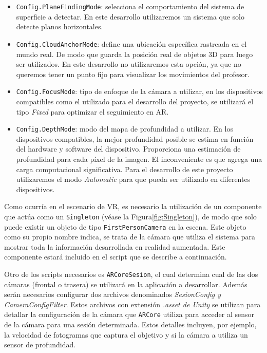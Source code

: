\begin{itemize}
    \item \texttt{Config.PlaneFindingMode}: selecciona el comportamiento del sistema de superficie a detectar. En este desarrollo utilizaremos un sistema que solo detecte planos horizontales.
    \item \texttt{Config.CloudAnchorMode}: define una ubicación específica rastreada en el mundo real. De modo que guarda la posición real de objetos 3D para luego ser utilizados. En este desarrollo no utilizaremos esta opción, ya que no queremos tener un punto fijo para visualizar los movimientos del profesor.
    \item \texttt{Config.FocusMode}: tipo de enfoque de la cámara a utilizar, en los dispositivos compatibles como el utilizado para el desarrollo del proyecto, se utilizará el tipo \textit{Fixed} para optimizar el seguimiento en AR.
    \item \texttt{Config.DepthMode}: modo del mapa de profundidad a utilizar. En los dispositivos compatibles, la mejor profundidad posible se estima en función del hardware y software del dispositivo. Proporciona una estimación de profundidad para cada píxel de la imagen. El inconveniente es que agrega una carga computacional significativa. Para el desarrollo de este proyecto utilizaremos el modo \textit{Automatic} para que pueda ser utilizado en diferentes dispositivos.
\end{itemize}

Como ocurría en el escenario de VR, es necesario la utilización de un componente que actúa como un \texttt{Singleton} (véase la Figura\ref{fig:Singleton}), de modo que solo puede existir un objeto de tipo \texttt{FirstPersonCamera} en la escena. Este objeto como su propio nombre indica, se trata de la cámara que utiliza el sistema para mostrar toda la información desarrollada en realidad aumentada. Este componente estará incluido en el script que se describe a continuación.

Otro de los scripts necesarios es \texttt{ARCoreSesion}, el cual determina cual de las dos cámaras (frontal o trasera) se utilizará en la aplicación a desarrollar. Además serán necesarios configurar dos archivos denominados \textit{SesionConfig y CameraConfigFilter}. Estos archivos con extensión \textit{.asset de Unity} se utilizan para detallar la configuración de la cámara que \texttt{ARCore} utiliza para acceder al sensor de la cámara para una sesión determinada. Estos detalles incluyen, por ejemplo, la velocidad de fotogramas que captura el objetivo y si la cámara a utiliza un sensor de profundidad.

